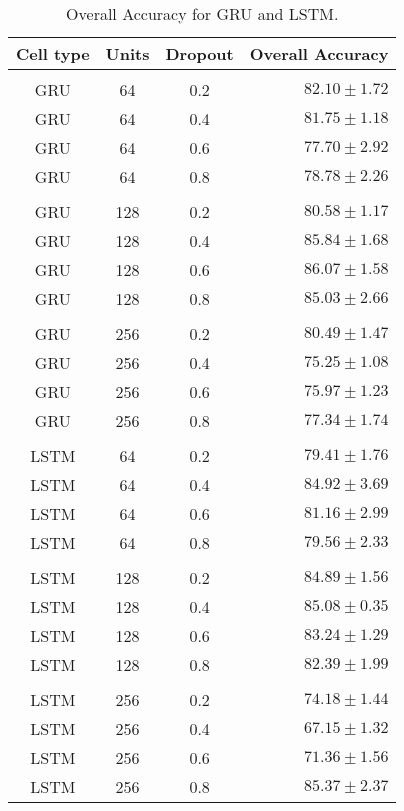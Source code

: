 \begin{table}[H]
  \centering
  \begin{tabular}{cccr} 
      Cell type & Units & Dropout & Overall Accuracy\\[0.2cm] 
      \hline \\[-0.2cm] 
      GRU   &   64  & 0.2 &  $82.10 \pm 1.72$\\
      GRU   &   64  & 0.4 &  $81.75 \pm 1.18$\\
      GRU   &   64  & 0.6 &  $77.70 \pm 2.92$\\
      GRU   &   64  & 0.8 &  $78.78 \pm 2.26$\\[0.05cm] \hline \\[-0.25cm]

      GRU   &   128 & 0.2 &  $80.58 \pm 1.17$\\
      GRU   &   128 & 0.4 &  $85.84 \pm 1.68$\\
      GRU   &   128 & 0.6 &  $\mathbf{86.07 \pm 1.58}$\\
      GRU   &   128 & 0.8 &  $85.03 \pm 2.66$\\[0.05cm] \hline \\[-0.25cm]

      GRU   &   256 & 0.2 &  $80.49 \pm 1.47$\\
      GRU   &   256 & 0.4 &  $75.25 \pm 1.08$\\
      GRU   &   256 & 0.6 &  $75.97 \pm 1.23$\\
      GRU   &   256 & 0.8 &  $77.34 \pm 1.74$\\[0.05cm] \hline \\[-0.25cm]

      LSTM  &   64  & 0.2 &  $79.41 \pm 1.76$\\
      LSTM  &   64  & 0.4 &  $84.92 \pm 3.69$\\
      LSTM  &   64  & 0.6 &  $81.16 \pm 2.99$\\
      LSTM  &   64  & 0.8 &  $79.56 \pm 2.33$\\[0.05cm] \hline \\[-0.25cm]

      LSTM  &   128 & 0.2 &  $84.89 \pm 1.56$\\
      LSTM  &   128 & 0.4 &  $85.08 \pm 0.35$\\
      LSTM  &   128 & 0.6 &  $83.24 \pm 1.29$\\
      LSTM  &   128 & 0.8 &  $82.39 \pm 1.99$\\[0.05cm] \hline \\[-0.25cm]

      LSTM  &   256 & 0.2 &  $74.18 \pm 1.44$\\
      LSTM  &   256 & 0.4 &  $67.15 \pm 1.32$\\
      LSTM  &   256 & 0.6 &  $71.36 \pm 1.56$\\
      LSTM  &   256 & 0.8 &  $\mathbf{85.37 \pm 2.37}$\\ 
      
  \end{tabular}
  \caption{Overall Accuracy for GRU and LSTM.}
  \label{tab:AJRNNcelltype}
\end{table}


